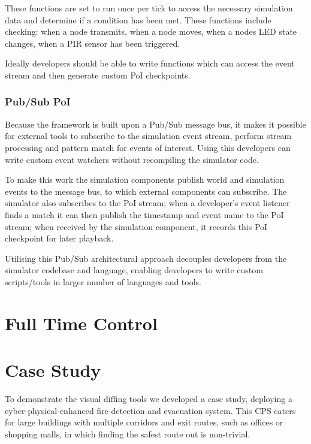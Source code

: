 These functions are set to run once per tick to access the necessary simulation data and determine if a condition has been met. These functions include checking: when a node transmits, when a node moves, when a nodes LED state changes, when a PIR sensor has been triggered.

Ideally developers should be able to write functions which can access the event stream and then generate custom PoI checkpoints.

\subsubsection{Pub/Sub PoI} %
\label{sub:pub_sub_poi}
Because the framework is built upon a Pub/Sub message bus, it makes it possible for external tools to subscribe to the simulation event stream, perform stream processing and pattern match for events of interest. Using this developers can write custom event watchers without recompiling the simulator code.

To make this work the simulation components publish world and simulation events to the message bus, to which external components can subscribe. The simulator also subscribes to the PoI stream; when a developer's event listener finds a match it can then publish the timestamp and event name to the PoI stream; when received by the simulation component, it records this PoI checkpoint for later playback.

Utilising this Pub/Sub architectural approach decouples developers from the simulator codebase and language, enabling developers to write custom scripts/tools in larger number of languages and tools.

\section{Full Time Control} %
\label{sec:full_time_control}


\section{Case Study}
\label{sec:case_study}
To demonstrate the visual diffing tools we developed a case study, deploying a cyber-physical-enhanced fire detection and evacuation system. This CPS caters for large buildings with multiple corridors and exit routes, such as offices or shopping malls, in which finding the safest route out is non-trivial.

